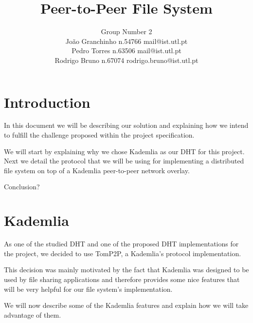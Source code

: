 \documentclass[times,9pt,article]{llncs}
\begin{document}
\title{Peer-to-Peer File System}

\author{Group Number 2 \\
Jo\~ao Granchinho n.54766 mail@ist.utl.pt \\
Pedro Torres  n.63506 mail@ist.utl.pt \\
Rodrigo Bruno n.67074 rodrigo.bruno@ist.utl.pt}
\maketitle


\section{Introduction}
In this document we will be describing our solution and explaining how we intend
to fulfill the challenge proposed within the project specification.

We will start by explaining why we chose Kademlia as our DHT for this project.
Next we detail the protocol that we will be using for implementing a distributed
file system on top of a Kademlia peer-to-peer network overlay.

Conclusion?

\section{Kademlia}

As one of the studied DHT and one of the proposed DHT implementations for the 
project, we decided to use TomP2P, a Kademlia's protocol implementation.

This decision was mainly motivated by the fact that Kademlia was designed to be
used by file sharing applications and therefore provides some nice features that
will be very helpful for our file system's implementation. 

We will now describe some of the Kademlia features and explain how we will take 
advantage of them. 
\end{document}
